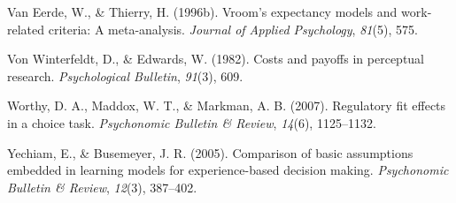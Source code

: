 \documentclass[english,,man]{apa6}
\theoremstyle{definition}
\theoremstyle{definition}
\theoremstyle{definition}
\theoremstyle{remark}
\begin{document}
\leavevmode\hypertarget{ref-vaneerde1996}{}%
Van Eerde, W., \& Thierry, H. (1996b). Vroom's expectancy models and
work-related criteria: A meta-analysis. \emph{Journal of Applied
Psychology}, \emph{81}(5), 575.

\leavevmode\hypertarget{ref-von1982}{}%
Von Winterfeldt, D., \& Edwards, W. (1982). Costs and payoffs in
perceptual research. \emph{Psychological Bulletin}, \emph{91}(3), 609.

\leavevmode\hypertarget{ref-worthy2007}{}%
Worthy, D. A., Maddox, W. T., \& Markman, A. B. (2007). Regulatory fit
effects in a choice task. \emph{Psychonomic Bulletin \& Review},
\emph{14}(6), 1125--1132.

\leavevmode\hypertarget{ref-yechiam2005}{}%
Yechiam, E., \& Busemeyer, J. R. (2005). Comparison of basic assumptions
embedded in learning models for experience-based decision making.
\emph{Psychonomic Bulletin \& Review}, \emph{12}(3), 387--402.
\end{document}
